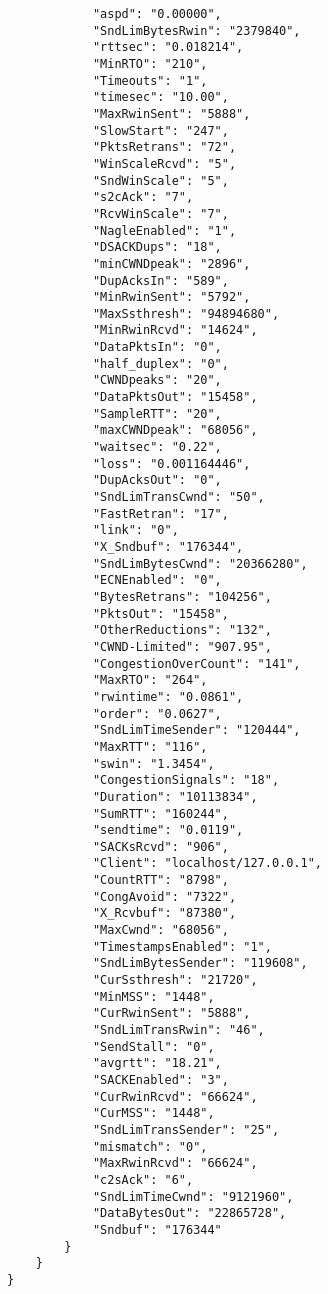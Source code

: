 \begin{verbatim}
            "aspd": "0.00000",
            "SndLimBytesRwin": "2379840",
            "rttsec": "0.018214",
            "MinRTO": "210",
            "Timeouts": "1",
            "timesec": "10.00",
            "MaxRwinSent": "5888",
            "SlowStart": "247",
            "PktsRetrans": "72",
            "WinScaleRcvd": "5",
            "SndWinScale": "5",
            "s2cAck": "7",
            "RcvWinScale": "7",
            "NagleEnabled": "1",
            "DSACKDups": "18",
            "minCWNDpeak": "2896",
            "DupAcksIn": "589",
            "MinRwinSent": "5792",
            "MaxSsthresh": "94894680",
            "MinRwinRcvd": "14624",
            "DataPktsIn": "0",
            "half_duplex": "0",
            "CWNDpeaks": "20",
            "DataPktsOut": "15458",
            "SampleRTT": "20",
            "maxCWNDpeak": "68056",
            "waitsec": "0.22",
            "loss": "0.001164446",
            "DupAcksOut": "0",
            "SndLimTransCwnd": "50",
            "FastRetran": "17",
            "link": "0",
            "X_Sndbuf": "176344",
            "SndLimBytesCwnd": "20366280",
            "ECNEnabled": "0",
            "BytesRetrans": "104256",
            "PktsOut": "15458",
            "OtherReductions": "132",
            "CWND-Limited": "907.95",
            "CongestionOverCount": "141",
            "MaxRTO": "264",
            "rwintime": "0.0861",
            "order": "0.0627",
            "SndLimTimeSender": "120444",
            "MaxRTT": "116",
            "swin": "1.3454",
            "CongestionSignals": "18",
            "Duration": "10113834",
            "SumRTT": "160244",
            "sendtime": "0.0119",
            "SACKsRcvd": "906",
            "Client": "localhost/127.0.0.1",
            "CountRTT": "8798",
            "CongAvoid": "7322",
            "X_Rcvbuf": "87380",
            "MaxCwnd": "68056",
            "TimestampsEnabled": "1",
            "SndLimBytesSender": "119608",
            "CurSsthresh": "21720",
            "MinMSS": "1448",
            "CurRwinSent": "5888",
            "SndLimTransRwin": "46",
            "SendStall": "0",
            "avgrtt": "18.21",
            "SACKEnabled": "3",
            "CurRwinRcvd": "66624",
            "CurMSS": "1448",
            "SndLimTransSender": "25",
            "mismatch": "0",
            "MaxRwinRcvd": "66624",
            "c2sAck": "6",
            "SndLimTimeCwnd": "9121960",
            "DataBytesOut": "22865728",
            "Sndbuf": "176344"
        }
    }
}
\end{verbatim}
